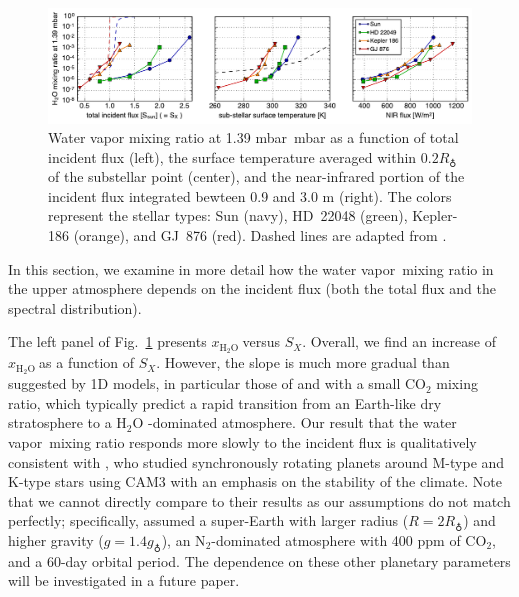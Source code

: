 \documentclass[11pt,numberedappendix,twocolappendix,]{emulateapj}
\def\water{H$_2$O }
\def\xwater{$x_\text{\water}$}
\def\preslevel{1.39 mbar\ }
\newcommand{\yf}[1]{{\color{orange}#1}}
\newcommand{\wv}{water vapor\ }
\begin{document}
\begin{figure}[!tb]
    \begin{center}
    \includegraphics[width=\hsize]{fig/xH2O_3panels.pdf}
    \end{center}
\caption{Water vapor mixing ratio at \preslevel mbar as a function of total incident flux (left), the surface temperature \yf{averaged within $0.2R_\earth$ of the substellar point} (center), and the near-infrared portion of the incident flux integrated bewteen 0.9 and 3.0 \textmu m (right). The colors represent the stellar types: Sun (navy), HD~22048 (green), Kepler-186 (orange), and GJ~876 (red). Dashed lines are adapted from \citet{Kasting1993}. }                                                                                                             
\label{fig:xH2O_S0X}
\end{figure}

In this section, we examine in more detail how the \wv mixing ratio in the upper atmosphere depends on the incident flux (both the total flux and the spectral distribution). 

The left panel of Fig.~\ref{fig:xH2O_S0X} presents \xwater versus $S_X$. 
Overall, we find an increase of \xwater as a function of $S_X$. 
However, the slope is much more gradual than suggested by 1D models, in particular those  of \citet{Kasting1993} and \citet{Wordsworth2013} with a small CO$_2$ mixing ratio, which typically predict a rapid transition from an Earth-like dry stratosphere to a \water-dominated atmosphere. 
Our result that the \wv mixing ratio responds more slowly to the incident flux is qualitatively consistent with \citet{Yang2013}, who studied synchronously rotating planets around M-type and K-type stars using CAM3 with an emphasis on the stability of the climate. 
Note that we cannot directly compare to their results as our assumptions do not match perfectly; specifically, \cite{Yang2013} assumed a super-Earth with larger radius ($R=2R_\earth$) and higher gravity ($g=1.4g_\earth$), an N$_2$-dominated atmosphere with 400 ppm of CO$_2$, and a 60-day orbital period. 
The dependence on these other planetary parameters will be investigated in a future paper. 
\end{document}
